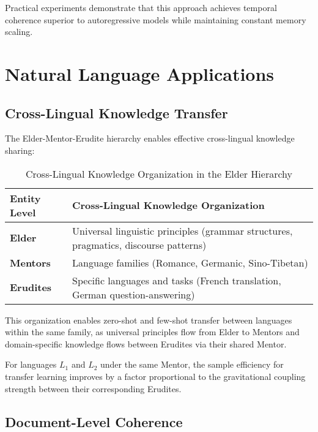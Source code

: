 Practical experiments demonstrate that this approach achieves temporal coherence superior to autoregressive models while maintaining constant memory scaling.

\section{Natural Language Applications}

\subsection{Cross-Lingual Knowledge Transfer}

The Elder-Mentor-Erudite hierarchy enables effective cross-lingual knowledge sharing:

\begin{table}[h]
\centering
\begin{tabular}{|p{3cm}|p{11cm}|}
\hline
\textbf{Entity Level} & \textbf{Cross-Lingual Knowledge Organization} \\
\hline
\textbf{Elder} & Universal linguistic principles (grammar structures, pragmatics, discourse patterns) \\
\hline
\textbf{Mentors} & Language families (Romance, Germanic, Sino-Tibetan) \\
\hline
\textbf{Erudites} & Specific languages and tasks (French translation, German question-answering) \\
\hline
\end{tabular}
\caption{Cross-Lingual Knowledge Organization in the Elder Hierarchy}
\end{table}

This organization enables zero-shot and few-shot transfer between languages within the same family, as universal principles flow from Elder to Mentors and domain-specific knowledge flows between Erudites via their shared Mentor.

\begin{theorem}
For languages $L_1$ and $L_2$ under the same Mentor, the sample efficiency for transfer learning improves by a factor proportional to the gravitational coupling strength between their corresponding Erudites.
\end{theorem}

\subsection{Document-Level Coherence}

